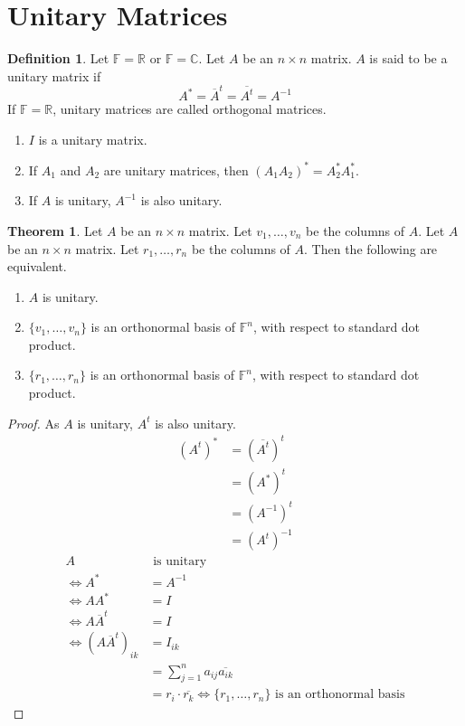 \documentclass[fleqn, a4paper, 12pt]{article}
\theoremstyle{definition}
\newtheorem{definition}{Definition} %
\theoremstyle{theorem}
\newtheorem{theorem}{Theorem} %
\theoremstyle{remark}
\numberwithin{corollary}{theorem}
\numberwithin{equation}{theorem}
\begin{document}
\section{Unitary Matrices}

\begin{definition}
	Let $\mathbb{F} = \mathbb{R}$ or $\mathbb{F} = \mathbb{C}$. Let $A$ be an $n \times n$ matrix. $A$ is said to be a unitary matrix if
	\begin{equation*}
		A^* = \overline{A}^t = \overline{A^t} = A^{-1}
	\end{equation*}
	If $\mathbb{F} = \mathbb{R}$, unitary matrices are called orthogonal matrices.
\end{definition}

\begin{enumerate}
	\item $I$ is a unitary matrix.
	\item If $A_1$ and $A_2$ are unitary matrices, then $(A_1 A_2)^* = A_2^* A_1^*$.
	\item If $A$ is unitary, $A^{-1}$ is also unitary.
\end{enumerate}

\begin{theorem}
	Let $A$ be an $n \times n$ matrix. Let $v_1, \dots, v_n$ be the columns of $A$. Let $A$ be an $n \times n$ matrix. Let $r_1, \dots, r_n$ be the columns of $A$.
	Then the following are equivalent.
	\begin{enumerate}
		\item $A$ is unitary.
		\item $\{v_1, \dots, v_n\}$ is an orthonormal basis of $\mathbb{F}^n$, with respect to standard dot product.
		\item $\{r_1, \dots, r_n\}$ is an orthonormal basis of $\mathbb{F}^n$, with respect to standard dot product.
	\end{enumerate}
\end{theorem}

\begin{proof}
	As $A$ is unitary, $A^t$ is also unitary.
	\begin{align*}
		(A^t)^* &= (\overline{A^t})^t\\
		&= (A^*)^t\\
		&= (A^{-1})^t\\
		&= (A^t)^{-1}
	\end{align*}
	\begin{align*}
		A &\text{ is unitary}\\
		\iff A^* &= A^{-1}\\
		\iff A A^* &= I\\
		\iff A \overline{A}^t &= I\\
		\iff (A \overline{A}^t)_{ik} &= I_{ik}\\
		&= \sum_{j = 1}^{n} a_{ij} \overline{a_{ik}}\\
		&= r_i \cdot \overline{r_k}
		\iff \{r_1, \dots, r_n\} \text{ is an orthonormal basis}
	\end{align*}
\end{proof}
\end{document}
